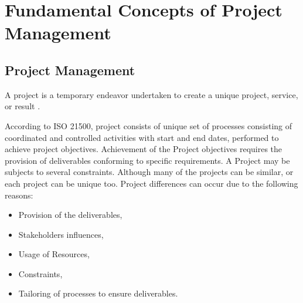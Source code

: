 %
%
\let\textcircled=\pgftextcircled
\chapter{Fundamental Concepts of Project Management}
\label{chap:intro}


 
 \section{Project Management}
 \label{sec:sec001}
 A project is a temporary endeavor undertaken to create a unique project, service, or result \cite{PMI-Website}.

According to ISO 21500, project consists of unique set of processes consisting of coordinated and controlled activities with start and end dates, performed to achieve project objectives. Achievement of the Project objectives requires the provision of deliverables conforming to specific requirements. A Project may be subjects to several constraints. Although many of the projects can be similar, or each project can be unique too. Project differences can occur due to the following reasons:
 \begin{itemize}
     \item Provision of the deliverables,
     \item Stakeholders influences, 
     \item Usage of Resources,
     \item Constraints,
     \item Tailoring of processes to ensure deliverables.
 \end{itemize}
     

